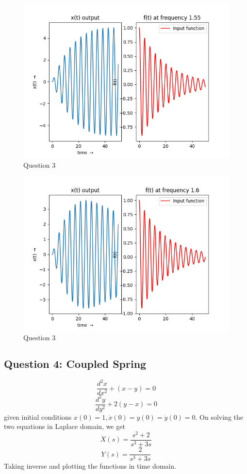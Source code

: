 \documentclass[11pt, a4paper]{article}
\begin{document}
\begin{figure}[!tbh]
   	\centering
  \includegraphics[scale=0.5]{Q3-4.png} 
    \caption{Question 3} 	
    \label{time response q3.4}
   \end{figure} 
   
\begin{figure}[!tbh]
   	\centering
  \includegraphics[scale=0.5]{Q3-5.png} 
    \caption{Question 3} 	
    \label{time response q3.5}
   \end{figure} 
   
\subsection{Question 4: Coupled Spring}
$$\frac{d^2x}{dx^2}+(x-y)=0$$
$$\frac{d^2y}{dy^2}+2(y-x)=0$$
given initial conditions $x(0)=1, \dot{x}(0)=y(0)=\dot y(0)=0$. On solving the two equations in Laplace domain, we get
$$X(s)=\frac{s^2+2}{s^3+3s}$$
$$Y(s)=\frac{2}{s^3+3s}$$
Taking inverse and plotting the functions in time domain. 
\end{document}
